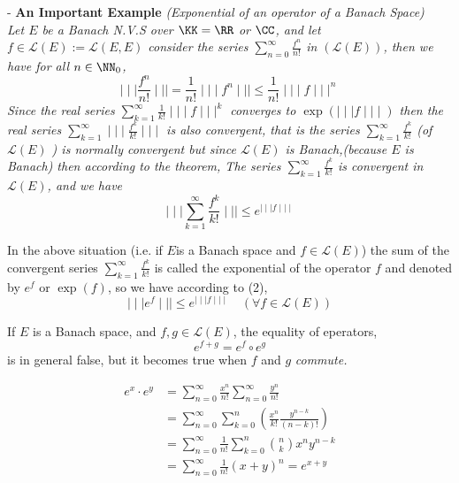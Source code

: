 - \textbf{An Important Example} \it(Exponential
of an operator of a Banach Space) \normalfont \\
 Let $E $ be a Banach N.V.S over $\KK = \RR$ or
 $\CC $, and let 
 $f \in \mathcal{L} (E) := \mathcal{L} (E,E)  $ 
 consider the series $\sum_{n=0}^{\infty } 
 \frac{f^{n}}{n!}$ in $\left( \mathcal{L} (E)  \right) $,
 then we have for all $n \in \NN_{0} $, 
 \[
 \mid \mid \mid  \frac{f^{n}}{
 n!} \mid \mid \mid  = 
 \frac{1}{n!}
 \mid \mid \mid  f^{n} \mid \mid \mid  
 \leq \frac{1}{n!} \mid \mid \mid  f \mid \mid \mid ^{n}
 \]
 Since the real series
 $\sum_{k=1}^{\infty}  \frac{1}{k!}
 \mid \mid \mid  f \mid \mid \mid 
 ^{k}$ converges to 
 $\exp{ \left( \mid \mid \mid  f \mid \mid \mid  \right)} $ 
 then the real series $\sum_{k=1}^{\infty}  
 \mid \mid \mid  \frac{f^{k}}{k!} \mid \mid \mid $  
 is also convergent, that is the series
 $\sum_{k=1}^{\infty}  \frac{f^{k}}{
 k!} $  (of $\mathcal{L} (E)  $ ) 
 is normally convergent but since
 $\mathcal{L} (E)  $ is Banach,(because 
 $E $ is Banach) then 
 according to the theorem, The series
 $\sum_{k=1}^{\infty}  \frac{f^{k}}{
 k!} $ is convergent in $\mathcal{L} (E)  $, 
 and we have 
 \begin{equation}
 \mid \mid \mid  \sum_{k=1}^{\infty}  
 \frac{f^{k}}{k!}\mid \mid \mid  
 \leq 
 e^{\mid \mid \mid  f \mid \mid \mid }
 \end{equation}
 \begin{definition}[]
 In the above situation (i.e. 
 if $E $is a Banach space and 
 $f \in \mathcal{L}(E)   $) the sum 
 of the convergent 
 series 
 $\sum_{k=1}^{\infty}  \frac{f^{k}}{k!} $ 
 is called the exponential
 of the operator 
 $f $ and denoted by $e^{f} $ 
 or $\exp{ (f) } $, so we have according to (2), 
 \begin{equation}
 \mid \mid \mid  e^{f} \mid \mid \mid  
 \leq 
 e^{\mid \mid \mid  f \mid \mid \mid }  
 \quad \left( \forall  f \in 
 \mathcal{L} (E) \right)
 \end{equation}
 \end{definition}
 \begin{remark}[]
 If $E $ is a Banach space, and 
 $f,g \in  \mathcal{L} (E)  $, the 
 equality of eperators, 
 \[
 e^{f+g}= 
 e^{f} \circ e^{g}
 \]
 is in general false, but it becomes true
 when $f$ and $g$ \it commute.
 \end{remark}
 \divider
 \begin{align*}
	 e^{x} \cdot  e^{y} &=  
	 \sum_{n=0}^{\infty}  
	 \frac{x^{n}}{n!}  
	 \sum_{n=0}^{\infty}  
	 \frac{y^n }{n ! } 
	 \\
			    &= 
			    \sum_{n=0}^{\infty}  
			    \sum_{k=0}^{n} 
			    \left( 
				    \frac{x^n }{
				   k!}
				   \frac{y^{n-k}}{
				   (n-k) !}
			    \right)
			    \\
			    &= \sum_{n=0}^{\infty}  
	\frac{1}{n!} \sum_{k=0}^{n}  
	\binom{n}{k} 
	x^n  y^{n-k} \\
			    &= 
			    \sum_{n=0}^{\infty}  
			   \frac{1}{n!}
			   (x+y) ^{n} = 
			   e^{x+y}
 \end{align*}
